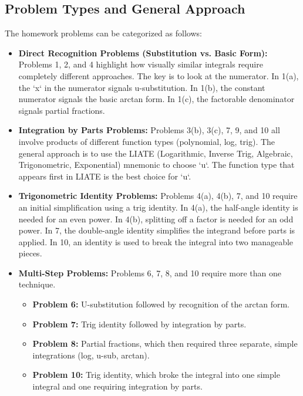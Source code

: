 \documentclass{article}
\begin{document}
\subsection{Problem Types and General Approach}
The homework problems can be categorized as follows:
\begin{itemize}
    \item \textbf{Direct Recognition Problems (Substitution vs. Basic Form):} Problems 1, 2, and 4 highlight how visually similar integrals require completely different approaches. The key is to look at the numerator. In 1(a), the `x` in the numerator signals u-substitution. In 1(b), the constant numerator signals the basic arctan form. In 1(c), the factorable denominator signals partial fractions.
    \item \textbf{Integration by Parts Problems:} Problems 3(b), 3(c), 7, 9, and 10 all involve products of different function types (polynomial, log, trig). The general approach is to use the LIATE (Logarithmic, Inverse Trig, Algebraic, Trigonometric, Exponential) mnemonic to choose `u`. The function type that appears first in LIATE is the best choice for `u`.
    \item \textbf{Trigonometric Identity Problems:} Problems 4(a), 4(b), 7, and 10 require an initial simplification using a trig identity. In 4(a), the half-angle identity is needed for an even power. In 4(b), splitting off a factor is needed for an odd power. In 7, the double-angle identity simplifies the integrand before parts is applied. In 10, an identity is used to break the integral into two manageable pieces.
    \item \textbf{Multi-Step Problems:} Problems 6, 7, 8, and 10 require more than one technique.
    \begin{itemize}
        \item \textbf{Problem 6:} U-substitution followed by recognition of the arctan form.
        \item \textbf{Problem 7:} Trig identity followed by integration by parts.
        \item \textbf{Problem 8:} Partial fractions, which then required three separate, simple integrations (log, u-sub, arctan).
        \item \textbf{Problem 10:} Trig identity, which broke the integral into one simple integral and one requiring integration by parts.
    \end{itemize}
\end{itemize}
\end{document}
